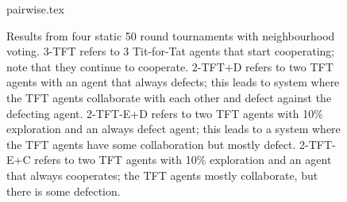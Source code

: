 \begin{figure} [ht]
\begin{center}
 {pairwise.tex} 
\end {center}
\caption{Results from four static 50 round tournaments with
  neighbourhood voting.  3-TFT refers to 3 Tit-for-Tat agents that
  start cooperating; note that they continue to cooperate.  2-TFT+D
  refers to two TFT agents with an agent that always defects;
  this leads to system where the TFT agents collaborate with each
  other and defect against the defecting agent.  2-TFT-E+D refers to
  two TFT agents with 10\% exploration and an always defect
  agent; this leads to a system where the TFT agents have some
  collaboration but mostly defect.  2-TFT-E+C refers to two
  TFT agents with 10\% exploration and an agent that always
  cooperates; the TFT agents mostly collaborate, but there is some
  defection. }
  \label{figStaticTwoVotes}
\end {figure}
